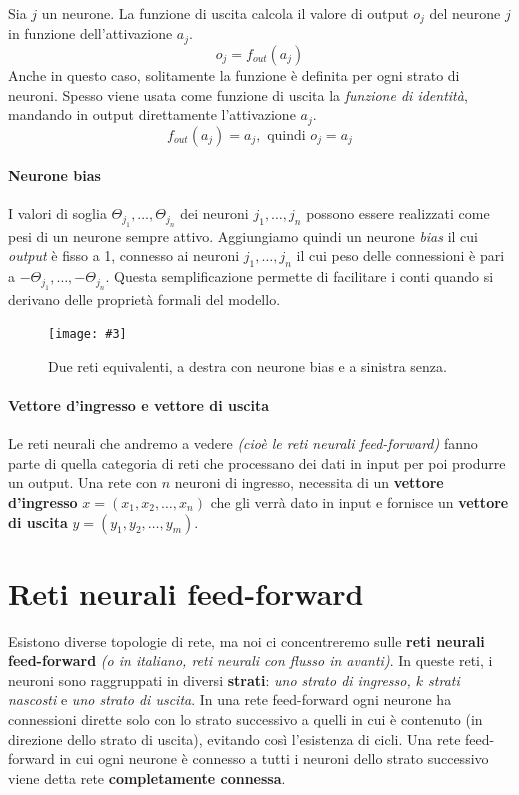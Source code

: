 \documentclass[12pt, twoside, letterpaper]{report}
\newcommand{\img}[4] {
	\begin{figure}
		\centering
		\texttt{[image: \#3]}\\
		\caption{#1}
		\label{fig:#4}
	\end{figure}
}
\begin{document}
			 	Sia $j$ un neurone. La funzione di uscita calcola il valore di output $o_j$ del neurone $j$ in funzione dell'attivazione $a_j$. $$o_j = f_{out}(a_j)$$  
			 	Anche in questo caso, solitamente la funzione è definita per ogni strato di neuroni. Spesso viene usata come funzione di uscita la \textit{funzione di identità}, mandando in output direttamente l'attivazione $a_j$. $$f_{out}(a_j) = a_j, \text{ quindi } o_j = a_j$$
			 	
			 \paragraph{Neurone bias} I valori di soglia $\Theta_{j_1}, \dots, \Theta_{j_n}$ dei neuroni $j_1, \dots, j_n$ possono essere realizzati come pesi di un neurone sempre attivo. Aggiungiamo quindi un neurone \textit{bias} il cui \textit{output} è fisso a 1, connesso ai neuroni $j_1, \dots, j_n$ il cui peso delle connessioni è pari a $-\Theta_{j_1}, \dots, -\Theta_{j_n}$. Questa semplificazione permette di facilitare i conti quando si derivano delle proprietà formali del modello.
			 
			 	\img{Due reti equivalenti, a destra con neurone bias e a sinistra senza. \cite{kriesel}}{0.5}{bias-neuron.png}{bias}
			 	
			 \paragraph{Vettore d'ingresso e vettore di uscita} Le reti neurali che andremo a vedere \textit{(cioè le reti neurali feed-forward)} fanno parte di quella categoria di reti che processano dei dati in input per poi produrre un output. Una rete con $n$ neuroni di ingresso, necessita di un \textbf{vettore d'ingresso} $x = (x_1, x_2, \dots, x_n)$ che gli verrà dato in input e fornisce un \textbf{vettore di uscita} $y = (y_1, y_2, \dots, y_m)$.  
			 	 			 
		\section{Reti neurali feed-forward}
			Esistono diverse topologie di rete, ma noi ci concentreremo sulle \textbf{reti neurali feed-forward} \textit{(o in italiano, reti neurali con flusso in avanti)}. In queste reti, i neuroni sono raggruppati in diversi \textbf{strati}: \textit{uno strato di ingresso, $k$ strati nascosti} e \textit{uno strato di uscita}. In una rete feed-forward ogni neurone ha connessioni dirette solo con lo strato successivo a quelli in cui è contenuto (in direzione dello strato di uscita), evitando così l'esistenza di cicli. Una rete feed-forward in cui ogni neurone è connesso a tutti i neuroni dello strato successivo viene detta rete \textbf{completamente connessa}.
\end{document}
